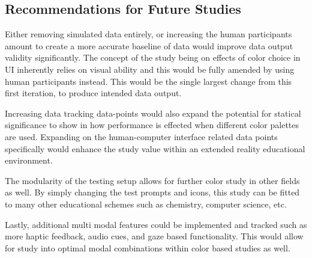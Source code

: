 \documentclass[acmlarge]{acmart}
\begin{document}
\subsection{Recommendations for Future Studies}
Either removing simulated data entirely, or increasing the human participants amount to create a more accurate baseline of data would improve data output validity significantly. The concept of the study being on effects of color choice in UI inherently relies on visual ability and this would be fully amended by using human participants instead. This would be the single largest change from this first iteration, to produce intended data output.

Increasing data tracking data-points would also expand the potential for statical significance to show in how performance is effected when different color palettes are used. Expanding on the human-computer interface related data points specifically would enhance the study value within an extended reality educational environment. 

The modularity of the testing setup allows for further color study in other fields as well. By simply changing the test prompts and icons, this study can be fitted to many other educational schemes such as chemistry, computer science, etc.

Lastly, additional multi modal features could be implemented and tracked such as more haptic feedback, audio cues, and gaze based functionality. This would allow for study into optimal modal combinations within color based studies as well.







\end{document}
